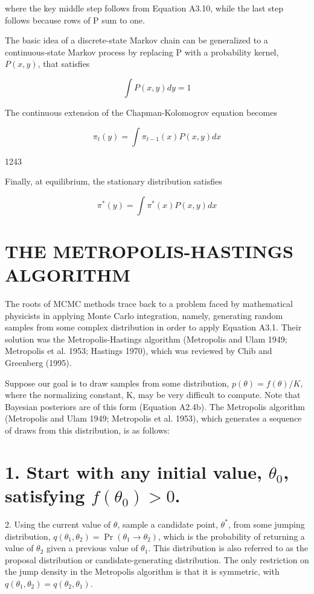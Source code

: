 \documentclass{article}
\begin{document}
where the key middle step follows from Equation A3.10, while the last step follows because rows of P sum to one.

The basic idea of a discrete-state Markov chain can be generalized to a continuous-state Markov process by replacing P with a probability kernel,  $ P(x, y) $, that satisfies

\begin{equation}
\int P(x,y)dy=1
\end{equation}

The continuous extension of the Chapman-Kolomogrov equation becomes

\begin{equation}
\pi_{t}(y)=\int\pi_{t-1}(x)P(x,y)dx
\end{equation}

1243

Finally, at equilibrium, the stationary distribution satisfies

\begin{equation}
\pi^{*}(y)=\int\pi^{*}(x)P(x,y)dx
\end{equation}

\section{THE METROPOLIS-HASTINGS ALGORITHM}
The roots of MCMC methods trace back to a problem faced by mathematical physicists in applying Monte Carlo integration, namely, generating random samples from some complex distribution in order to apply Equation A3.1. Their solution was the Metropolis-Hastings algorithm (Metropolis and Ulam 1949; Metropolis et al. 1953; Hastings 1970), which was reviewed by Chib and Greenberg (1995).

Suppose our goal is to draw samples from some distribution,  $ p(\theta) = f(\theta)/K $, where the normalizing constant, K, may be very difficult to compute. Note that Bayesian posteriors are of this form (Equation A2.4b). The Metropolis algorithm (Metropolis and Ulam 1949; Metropolis et al. 1953), which generates a sequence of draws from this distribution, is as follows:

\section{1. Start with any initial value,  $ \theta_{0} $, satisfying  $ f(\theta_{0}) > 0 $.}
2. Using the current value of $\theta$, sample a candidate point, $\theta^{*}$, from some jumping distribution, $q(\theta_1, \theta_2) = \Pr(\theta_1 \to \theta_2)$, which is the probability of returning a value of $\theta_2$ given a previous value of $\theta_1$. This distribution is also referred to as the proposal distribution or candidate-generating distribution. The only restriction on the jump density in the Metropolis algorithm is that it is symmetric, with $q(\theta_1, \theta_2) = q(\theta_2, \theta_1)$.
\end{document}
